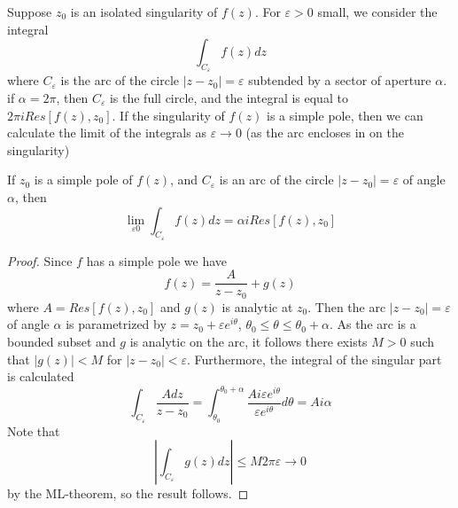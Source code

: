 \documentclass[12pt, a4paper, oneside, openright, titlepage]{book}
\begin{document}
Suppose $z_0$ is an isolated singularity of $f(z)$. For $\varepsilon > 0$ small, we consider the integral \begin{equation*}
    \int_{C_{\varepsilon}}f(z)dz
\end{equation*}
where $C_{\varepsilon}$ is the arc of the circle $|z-z_0| = \varepsilon$ subtended by a sector of aperture $\alpha$. if $\alpha = 2\pi$, then $C_{\varepsilon}$ is the full circle, and the integral is equal to $2\pi iRes[f(z),z_0]$. If the singularity of $f(z)$ is a simple pole, then we can calculate the limit of the integrals as $\varepsilon \rightarrow 0$ (as the arc encloses in on the singularity)

\begin{namthm}
    If $z_0$ is a simple pole of $f(z)$, and $C_{\varepsilon}$ is an arc of the circle $|z-z_0| = \varepsilon$ of angle $\alpha$, then \begin{equation*}
        \lim\limits_{\varepsilon 0}\int_{C_{\varepsilon}}f(z)dz = \alpha iRes[f(z),z_0]
    \end{equation*}
\end{namthm}
\begin{proof}
    Since $f$ has a simple pole we have \begin{equation*}
        f(z) = \frac{A}{z-z_0}+g(z)
    \end{equation*}
    where $A = Res[f(z),z_0]$ and $g(z)$ is analytic at $z_0$. Then the arc $|z-z_0| = \varepsilon$ of angle $\alpha$ is parametrized by $z = z_0+\varepsilon e^{i\theta}$, $\theta_0\leq \theta\leq \theta_0+\alpha$. As the arc is a bounded subset and $g$ is analytic on the arc, it follows there exists $M > 0$ such that $|g(z)| < M$ for $|z-z_0| < \varepsilon$. Furthermore, the integral of the singular part is calculated \begin{equation*}
        \int_{C_{\varepsilon}}\frac{Adz}{z-z_0} = \int_{\theta_0}^{\theta_0+\alpha}\frac{Ai\varepsilon e^{i\theta}}{\varepsilon e^{i\theta}}d\theta = Ai\alpha
    \end{equation*}
    Note that \begin{equation*}
        \left|\int_{C_{\varepsilon}}g(z)dz\right| \leq M2\pi\varepsilon\rightarrow 0
    \end{equation*}
    by the ML-theorem, so the result follows.
\end{proof}
\end{document}

